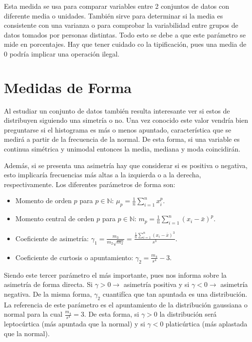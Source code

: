 \documentclass[10pt,a4paper]{book}
\begin{document}
Esta medida se usa para comparar variables entre 2 conjuntos de datos con diferente media o unidades. También sirve para determinar si la media es consistente con una varianza o para comprobar la variabilidad entre grupos de datos tomados por personas distintas. Todo esto se debe a que este parámetro se mide en porcentajes. Hay que tener cuidado co la tipificación, pues una media de $0$ podría implicar una operación ilegal. 

\section{Medidas de Forma}
Al estudiar un conjunto de datos también resulta interesante ver si estos de distribuyen siguiendo una simetría o no. Una vez conocido este valor vendría bien preguntarse si el histograma es más o menos apuntado, característica que se medirá a partir de la frecuencia de la normal. De esta forma, si una variable es continua simétrica y unimodal entonces la media, mediana y moda coincidirán.

Además, si se presenta una asimetría hay que considerar si es positiva o negativa, esto implicaría frecuencias más altas a la izquierda o a la derecha, respectivamente. Los diferentes parámetros de forma son: 
\begin{itemize}
	\item Momento de orden $p$ para $p\in\mathbb{N}$: $\mu_p=\frac1{n}\sum\limits_{i=1}^nx_i^p$.
	\item Momento central de orden $p$ para $p\in\mathbb{N}$: $m_p = \frac1{n}\sum\limits_{i=1}^n(x_i-\bar x)^p$.
	\item Coeficiente de asimetría: $\gamma_1= \frac{m_3}{m_2\sqrt{m_2}} = \frac{\frac{1}{n}\sum_{i=1}^n(x_i-\bar x)^3}{s^3}$.
	\item Coeficiente de curtosis o apuntamiento: $\gamma_2 = \frac{m_4}{s^4}-3$.
\end{itemize}
Siendo este tercer parámetro el más importante, pues nos informa sobre la asimetría de forma directa. Si $\gamma > 0\longrightarrow$ asimetría positiva y si $\gamma < 0\longrightarrow$ asimetría negativa. De la misma forma, $\gamma_2$ cuantifíca que tan apuntada es una distribución. La referencia de este parámetro es el apuntamiento de la distribución gaussiana o normal para la cual $\frac{m_4}{s^4} = 3$. De esta forma, si $\gamma >0$ la distribución será leptocúrtica (más apuntada que la normal) y si $\gamma<0$ platicúrtica (más aplastada que la normal).

















		
\end{document}
